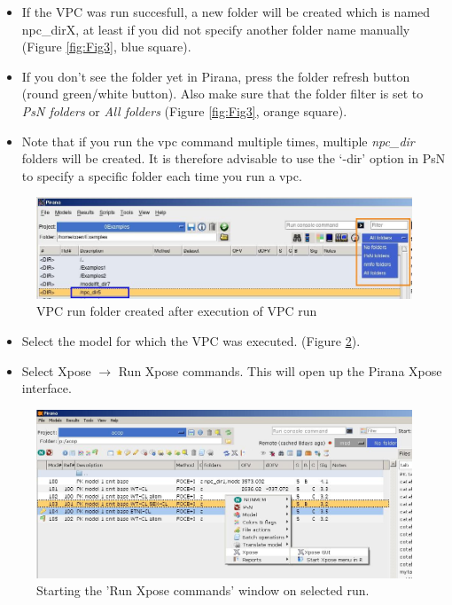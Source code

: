 \begin{itemize}
\item If the VPC was run succesfull, a new folder will be created
  which is named npc\_dirX, at least if you did not specify another
  folder name manually (Figure \ref{fig:Fig3}, blue square).
\item If you don't see the folder yet in Pirana, press the folder
  refresh button (round green/white button). Also make sure that the folder filter is set to
  \emph{PsN folders} or \emph{All folders} (Figure \ref{fig:Fig3}, orange square).
\item Note that if you run the vpc command multiple times, multiple
  \emph{npc\_dir} folders will be created. It is therefore advisable
  to use the `-dir' option in PsN to specify a specific folder each
  time you run a vpc.
\end{itemize}

\begin{figure}[h] \centering
    \includegraphics[scale=.35]{images/vpc_4.jpg}
    \caption{VPC run folder created after execution of VPC run
    \label{fig:Fig4}}
\end{figure}

\begin{itemize}
\item Select the model for which the VPC was executed. (Figure \ref{fig:Fig5}).
\item Select Xpose $\rightarrow$ Run Xpose commands. This will open up
  the Pirana Xpose interface.
\end{itemize}

\begin{figure}[h] \centering
    \includegraphics[scale=.4]{images/vpc_5.jpg}
    \caption{Starting the 'Run Xpose commands' window on selected run.
    \label{fig:Fig5}}
\end{figure}

